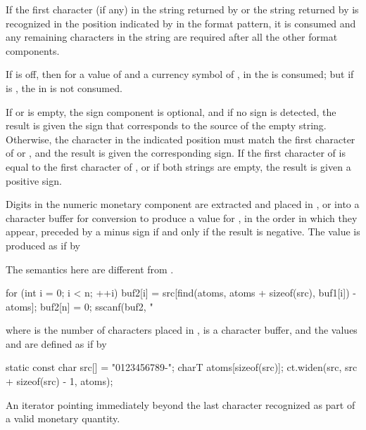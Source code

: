 \begin{itemdescr}
\pnum
If the first character (if any) in
the string  returned by  or
the string  returned by 
is recognized in the position indicated by  in the format pattern,
it is consumed and
any remaining characters in the string are required
after all the other format components.
\begin{example}
If  is off,
then for a  value of  and
a currency symbol of ,
in  the  is consumed;
but if  is ,
the  in  is not consumed.
\end{example}
If  or  is empty,
the sign component is optional, and
if no sign is detected,
the result is given the sign that corresponds to the source of the empty string.
Otherwise,
the character in the indicated position must match
the first character of  or ,
and the result is given the corresponding sign.
If the first character of  is equal to
the first character of ,
or if both strings are empty,
the result is given a positive sign.

\pnum
Digits in the numeric monetary component are extracted and
placed in , or into a character buffer 
for conversion to produce a value for ,
in the order in which they appear,
preceded by a minus sign if and only if the result is negative.
The value  is produced as if by
\begin{footnote}
The semantics here are different from .
\end{footnote}
\begin{codeblock}
for (int i = 0; i < n; ++i)
  buf2[i] = src[find(atoms, atoms + sizeof(src), buf1[i]) - atoms];
buf2[n] = 0;
sscanf(buf2, "%
\end{codeblock}
where  is the number of characters placed in ,
 is a character buffer, and
the values  and  are defined as if by
\begin{codeblock}
static const char src[] = "0123456789-";
charT atoms[sizeof(src)];
ct.widen(src, src + sizeof(src) - 1, atoms);
\end{codeblock}

\pnum
\returns
An iterator pointing immediately beyond
the last character recognized as part of a valid monetary quantity.
\end{itemdescr}

